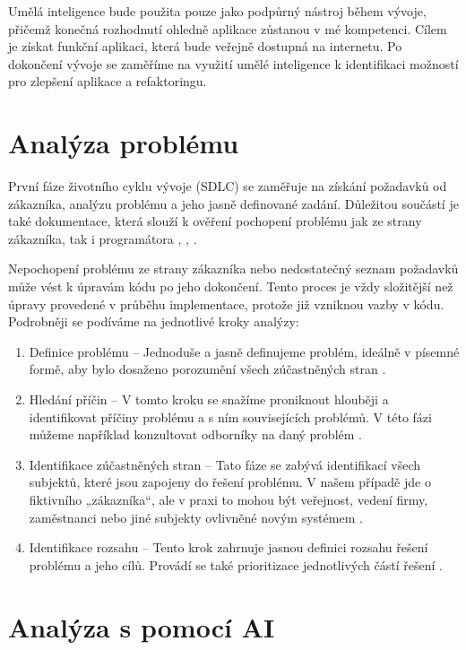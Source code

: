 \documentclass[FM,DP]{tulthesis}
\begin{document}
		Umělá inteligence bude použita pouze jako podpůrný nástroj během vývoje, přičemž konečná rozhodnutí ohledně aplikace zůstanou v mé kompetenci. Cílem je získat funkční aplikaci, která bude veřejně dostupná na internetu. Po dokončení vývoje se zaměříme na využití umělé inteligence k identifikaci možností pro zlepšení aplikace a refaktoringu.
		
		\section{Analýza problému}
		První fáze životního cyklu vývoje (SDLC) se zaměřuje na získání požadavků od zákazníka, analýzu problému a jeho jasně definované zadání. Důležitou součástí je také dokumentace, která slouží k ověření pochopení problému jak ze strany zákazníka, tak i programátora \cite{problem_analysis3}, \cite{software_analysis}, \cite{SWEBook}.
		
		Nepochopení problému ze strany zákazníka nebo nedostatečný seznam požadavků může vést k úpravám kódu po jeho dokončení. Tento proces je vždy složitější než úpravy provedené v průběhu implementace, protože již vzniknou vazby v kódu. Podrobněji se podíváme na jednotlivé kroky analýzy:
		
		\begin{enumerate}
			\item Definice problému – Jednoduše a jasně definujeme problém, ideálně v písemné formě, aby bylo dosaženo porozumění všech zúčastněných stran \cite{problem_analysis3}.
			\item Hledání příčin – V tomto kroku se snažíme proniknout hlouběji a identifikovat příčiny problému a s ním souvisejících problémů. V této fázi můžeme například konzultovat odborníky na daný problém \cite{problem_analysis3}.
			\item Identifikace zúčastněných stran – Tato fáze se zabývá identifikací všech subjektů, které jsou zapojeny do řešení problému. V našem případě jde o fiktivního „zákazníka“, ale v praxi to mohou být veřejnost, vedení firmy, zaměstnanci nebo jiné subjekty ovlivněné novým systémem \cite{problem_analysis3}.
			\item Identifikace rozsahu – Tento krok zahrnuje jasnou definici rozsahu řešení problému a jeho cílů. Provádí se také prioritizace jednotlivých částí řešení \cite{problem_analysis3}. 
		\end{enumerate}
		
		\section{Analýza s pomocí AI} 
\end{document}
